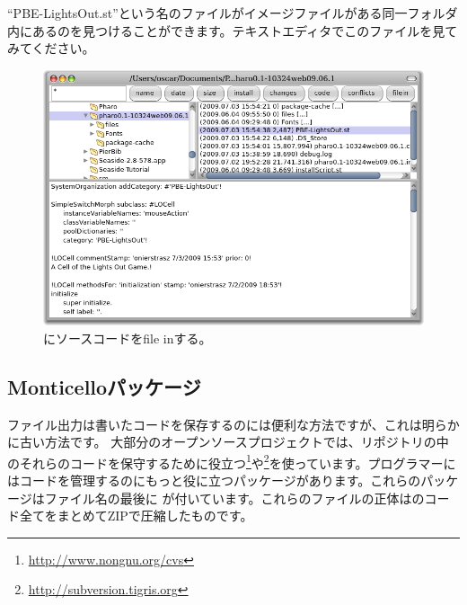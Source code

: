 \documentclass[a4paper,10pt,twoside]{book}
\begin{document}
``PBE-LightsOut.st''という名のファイルがイメージファイルがある同一フォルダ内にあるのを見つけることができます。テキストエディタでこのファイルを見てみてください。


\begin{figure}[ht]
\centerline {\includegraphics[width=\textwidth]{FileIn}}
\caption{\pharo{}にソースコードをfile inする。
}
\end{figure}

\subsection{Monticelloパッケージ}
ファイル出力は書いたコードを保存するのには便利な方法ですが、これは明らかに古い方法です。
大部分のオープンソースプロジェクトでは、リポジトリの中のそれらのコードを保守するために役立つ\footnote{\url{http://www.nongnu.org/cvs}}や\footnote{\url{http://subversion.tigris.org}}を使っています。\pharo{}プログラマーにはコードを管理するのにもっと役に立つパッケージがあります。これらのパッケージはファイル名の最後に が付いています。これらのファイルの正体はのコード全てをまとめてZIPで圧縮したものです。
\end{document}

